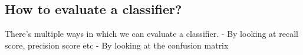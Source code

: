 \documentclass[11pt]{article}
\begin{document}
    \hypertarget{how-to-evaluate-a-classifier}{%
\subsection{How to evaluate a
classifier?}\label{how-to-evaluate-a-classifier}}

There's multiple ways in which we can evaluate a classifier. - By
looking at recall score, precision score etc - By looking at the
confusion matrix


    
    
    
    
\end{document}

